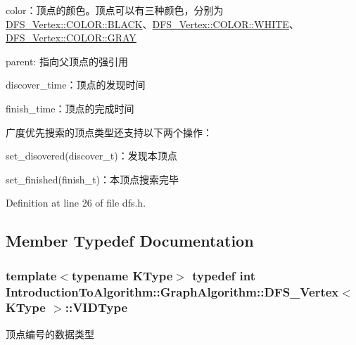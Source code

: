 \begin{DoxyItemize}
\item {\ttfamily color}：顶点的颜色。顶点可以有三种颜色，分别为{\ttfamily \hyperlink{struct_introduction_to_algorithm_1_1_graph_algorithm_1_1_d_f_s___vertex_a9455444fdfb1b29f24c1d27e74e7c124a08d0012388564e95c3b4a7407cf04965}{D\+F\+S\+\_\+\+Vertex\+::\+C\+O\+L\+O\+R\+::\+B\+L\+A\+C\+K}}、{\ttfamily \hyperlink{struct_introduction_to_algorithm_1_1_graph_algorithm_1_1_d_f_s___vertex_a9455444fdfb1b29f24c1d27e74e7c124ab5bf627e448384cf3a4c35121ca6008d}{D\+F\+S\+\_\+\+Vertex\+::\+C\+O\+L\+O\+R\+::\+W\+H\+I\+T\+E}}、{\ttfamily \hyperlink{struct_introduction_to_algorithm_1_1_graph_algorithm_1_1_d_f_s___vertex_a9455444fdfb1b29f24c1d27e74e7c124a48bf014c704c9eaae100a98006a37bf7}{D\+F\+S\+\_\+\+Vertex\+::\+C\+O\+L\+O\+R\+::\+G\+R\+A\+Y}}
\item {\ttfamily parent}\+: 指向父顶点的强引用
\item {\ttfamily discover\+\_\+time}：顶点的发现时间
\item {\ttfamily finish\+\_\+time}：顶点的完成时间
\end{DoxyItemize}

广度优先搜索的顶点类型还支持以下两个操作：


\begin{DoxyItemize}
\item {\ttfamily set\+\_\+disovered(discover\+\_\+t)}：发现本顶点
\item {\ttfamily set\+\_\+finished(finish\+\_\+t)}：本顶点搜索完毕 
\end{DoxyItemize}

Definition at line 26 of file dfs.\+h.



\subsection{Member Typedef Documentation}
\hypertarget{struct_introduction_to_algorithm_1_1_graph_algorithm_1_1_d_f_s___vertex_aeb115a10366eb62880d2672d4e1da7a1}{}
\subsubsection[{V\+I\+D\+Type}]{\setlength{\rightskip}{0pt plus 5cm}template$<$typename K\+Type$>$ typedef int {\bf Introduction\+To\+Algorithm\+::\+Graph\+Algorithm\+::\+D\+F\+S\+\_\+\+Vertex}$<$ K\+Type $>$\+::{\bf V\+I\+D\+Type}}\label{struct_introduction_to_algorithm_1_1_graph_algorithm_1_1_d_f_s___vertex_aeb115a10366eb62880d2672d4e1da7a1}
顶点编号的数据类型 

